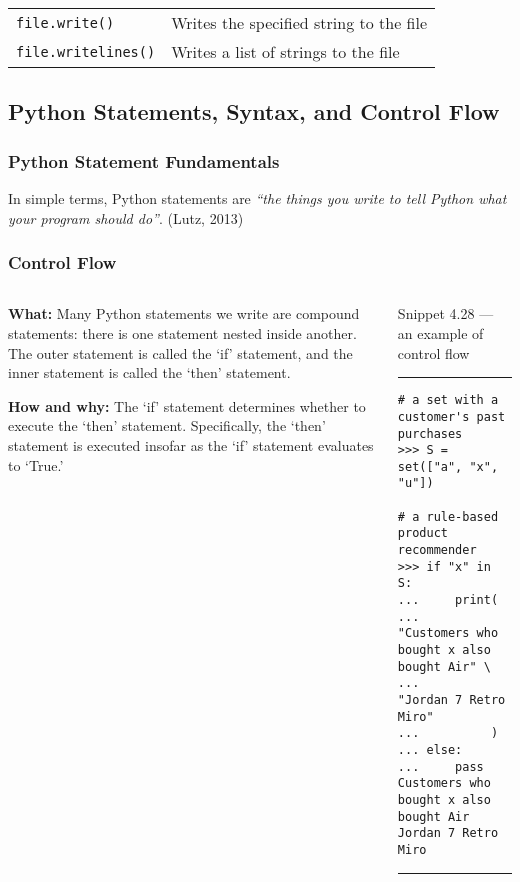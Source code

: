 \documentclass[aspectratio=1610]{beamer}
\begin{document}
\begin{frame}
\begin{table}[!htbp]
\begin{tabular}{ll}
    		\texttt{file.write()     } & Writes the specified string to the file                                              \\
    		\texttt{file.writelines()} & Writes a list of strings to the file                                                 \\
    		\bottomrule%
    	\end{tabular}
    \end{table}
\end{frame}

\subsection{Python Statements, Syntax, and Control Flow}

\begin{frame}
    \frametitle{Python Statement Fundamentals}
    \centering
    \Large In simple terms, Python statements are \textit{``the things you write to tell Python what your program should do''}. (Lutz, 2013)
\end{frame}

\begin{frame}[fragile]
    \frametitle{Control Flow}
        \begin{columns}
            \begin{column}{0.35\textwidth}
            \quad \textbf{What:} 
            Many Python statements we write are compound statements: there is one statement nested inside another. The outer statement is called the `if' statement, and the inner statement is called the `then' statement.
            \vspace{1em}
        
            \quad \textbf{How and why:}
            The `if' statement determines whether to execute the `then' statement. Specifically, the `then' statement is executed insofar as the `if' statement evaluates to `True.'
            \end{column}
            \begin{column}{0.55\textwidth}
            Snippet 4.28 --- an example of control flow
            \rule{\textwidth}{1pt}
                \scriptsize
                \begin{verbatim} 
# a set with a customer's past purchases
>>> S = set(["a", "x", "u"])

# a rule-based product recommender 
>>> if "x" in S:
...     print(
...          "Customers who bought x also bought Air" \ 
...          "Jordan 7 Retro Miro"
...          )
... else:
...     pass
Customers who bought x also bought Air Jordan 7 Retro Miro
               \end{verbatim}
           \rule{\textwidth}{1pt}
           \end{column}
    \end{columns}
\end{frame}
\end{document}
